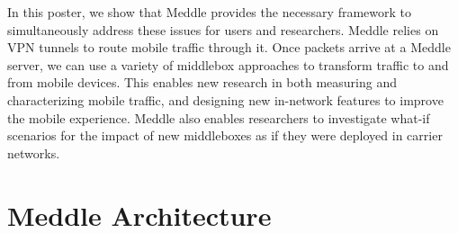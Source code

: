 \documentclass{sig-alternate-10pt}
\newcommand{\eat}[1]{}
\newcommand{\meddle}{{Meddle}\xspace}
\begin{document}
In this poster, we show that \meddle provides the necessary
framework to simultaneously address these issues for users and
researchers. \meddle relies on VPN tunnels to route mobile traffic
through it. Once packets arrive at a \meddle server, we can use a
variety of middlebox approaches to transform traffic to and from
mobile devices. This enables new research in both measuring and
characterizing mobile traffic, and designing new in-network features
to improve the mobile experience. \meddle also enables researchers
to investigate what-if scenarios for the impact of new middleboxes as
if they were deployed in carrier networks.   

\eat{
  -- services for cell phones
        -- what's diff't about cell phones?
            -- power
                -- prefetching/batching data
                -- offloading processing (virus scanning, comp vision, data analysis)
            -- exfiltration/desire to monitor (even from user)
            -- device limitations (transcoding)
           
        -- what's slightly different but needs tweaked?
            -- IDS -- different attacks/viruses
            -- Proto accel -- some protocols difft?

        -- what's exactly the same
            -- performance
            -- privacy (Do not Track, obfuscation)
            -- Protocol rollout (DNSSEC; SPDY, MPTCP)

    -- users locked out of their own devices
    -- platform for measurement
        }
\eat{
    \section{Service Deployment}

    \section{Measurement Platform}

    \section{Challenges}

    \section{Conclusion \& Related Work}\
}
   
\section{\meddle Architecture}
\end{document}
